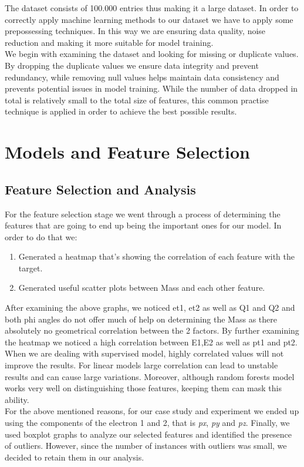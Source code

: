 \documentclass[12pt]{article}
\begin{document}
\newpage
The dataset consists of 100.000 entries thus making it a large dataset. In order to correctly apply machine learning methods to our dataset we have to apply some prepossessing techniques. In this way we are ensuring data quality, noise reduction and making it more suitable for model training.\cite{scikit-learn-Preprocessing}\\

We begin with examining the dataset and looking for missing or duplicate values. By dropping the duplicate values we ensure data integrity and prevent redundancy, while removing null values helps maintain data consistency and prevents potential issues in model training. While the number of data dropped in total is relatively small to the total size of features, this common practise technique is applied in order to achieve the best possible results.


\section{Models and Feature Selection}

\subsection{Feature Selection and Analysis}
For the feature selection stage we went through a process of determining the features that are going to end up being the important ones for our model. In order to do that we:

\begin{enumerate}
    \item Generated a heatmap that's showing the correlation of each feature with the target.
    \item Generated useful scatter plots between Mass and each other feature.
\end{enumerate}

After examining the above graphs, we noticed et1, et2 as well as Q1 and Q2 and both phi angles do not offer much of help on determining the Mass as there absolutely no geometrical correlation  between the 2 factors. By further examining the heatmap we noticed a high correlation between E1,E2 as well as pt1 and pt2. When we are dealing with supervised model, highly correlated values will not improve the results. For linear models large correlation can lead to unstable results and can cause large variations. Moreover, although random forests model works very well on distinguishing those features, keeping them can mask this ability.\\
For the above mentioned reasons, for our case study and experiment we ended up using the components of the electron 1 and 2, that is \textit{px}, \textit{py} and \textit{pz}. Finally, we used boxplot graphs to analyze our selected features and identified the presence of outliers. However, since the number of instances with outliers was small, we decided to retain them in our analysis.
\end{document}
